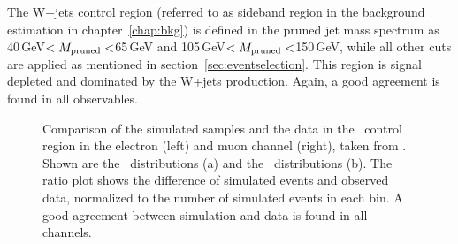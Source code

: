 \noindent The W+jets control region (referred to as sideband region in the background estimation in chapter~\ref{chap:bkg}) is defined in the pruned jet mass spectrum as 40\,GeV$<M_\mathrm{pruned}<$65\,GeV and 105\,GeV$<M_\mathrm{pruned}<$150\,GeV, while all other cuts are applied as mentioned in section~\ref{sec:eventselection}. This region is signal depleted and dominated by the W+jets production. Again, a good agreement is found in all observables.

\begin{figure}
	\centering
	\begin{minipage}{0.5\textwidth}
	\end{minipage}%
	\begin{minipage}{0.5\textwidth}
	\end{minipage}
	\caption[Comparison of the simulated samples and the data in the \ttbar \ control region]{Comparison of the simulated samples and the data in the \ttbar \ control region in the electron (left) and muon channel (right), taken from \cite{PAS}. Shown are the \Mpr \ distributions (a) and the \MWV \ distributions (b). The ratio plot shows the difference of simulated events and observed data, normalized to the number of simulated events in each bin. A good agreement between simulation and data is found in all channels.}
	\label{fig:reco:control}
\end{figure}
